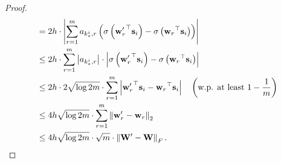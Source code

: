 \documentclass[10pt]{article}
\def\rvs{{\mathbf{s}}}
\def\rvw{{\mathbf{w}}}
\def\rmW{{\mathbf{W}}}
\begin{document}
\begin{proof}
\begin{equation*}
\begin{split}
    &= 2 h \cdot \left| \sum\limits_{r=1}^{m}{a_{k_*^i,r} \left( \sigma\left({\rvw_r^\prime}^\top \rvs_i\right) - \sigma\left({\rvw_r}^\top \rvs_i\right) \right) } \right| \\
    &\le 2 h \cdot \sum\limits_{r=1}^{m}{ \left| a_{k_*^i,r} \right| \cdot \left| \sigma\left({\rvw_r^\prime}^\top \rvs_i\right) - \sigma\left({\rvw_r}^\top \rvs_i\right) \right| } \\
    &\le 2 h \cdot 2 \sqrt{\log{2m}} \cdot \sum\limits_{r=1}^{m}{ \left| {\rvw_r^\prime}^\top \rvs_i - {\rvw_r}^\top \rvs_i \right| } \quad \left( \text{w.p. at least } 1 - \frac{1}{m} \right) \\
    &\le 4h \sqrt{\log{2m}} \cdot \sum\limits_{r=1}^{m}{ \left\| \rvw_r^\prime - \rvw_r \right\|_2 } \\
    &\le 4h \sqrt{\log{2m}} \cdot \sqrt{m} \cdot \left\| \rmW^\prime - \rmW \right\|_F. \qedhere
\end{split}
\end{equation*}
\end{proof}
\end{document}
